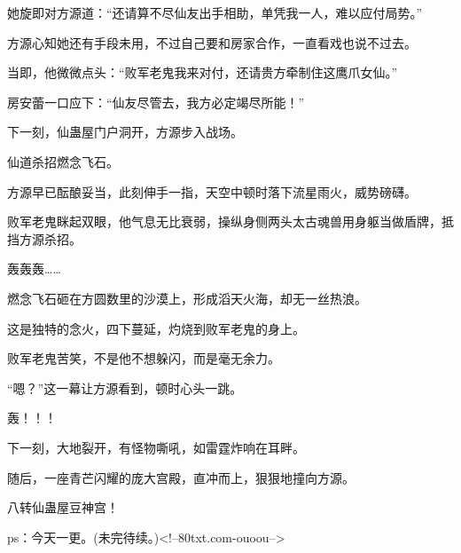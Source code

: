 \begin{this_body}
她旋即对方源道：“还请算不尽仙友出手相助，单凭我一人，难以应付局势。”

方源心知她还有手段未用，不过自己要和房家合作，一直看戏也说不过去。

当即，他微微点头：“败军老鬼我来对付，还请贵方牵制住这鹰爪女仙。”

房安蕾一口应下：“仙友尽管去，我方必定竭尽所能！”

下一刻，仙蛊屋门户洞开，方源步入战场。

仙道杀招燃念飞石。

方源早已酝酿妥当，此刻伸手一指，天空中顿时落下流星雨火，威势磅礴。

败军老鬼眯起双眼，他气息无比衰弱，操纵身侧两头太古魂兽用身躯当做盾牌，抵挡方源杀招。

轰轰轰……

燃念飞石砸在方圆数里的沙漠上，形成滔天火海，却无一丝热浪。

这是独特的念火，四下蔓延，灼烧到败军老鬼的身上。

败军老鬼苦笑，不是他不想躲闪，而是毫无余力。

“嗯？”这一幕让方源看到，顿时心头一跳。

轰！！！

下一刻，大地裂开，有怪物嘶吼，如雷霆炸响在耳畔。

随后，一座青芒闪耀的庞大宫殿，直冲而上，狠狠地撞向方源。

八转仙蛊屋豆神宫！

ps：今天一更。(未完待续。)<!--80txt.com-ouoou-->

\end{this_body}

